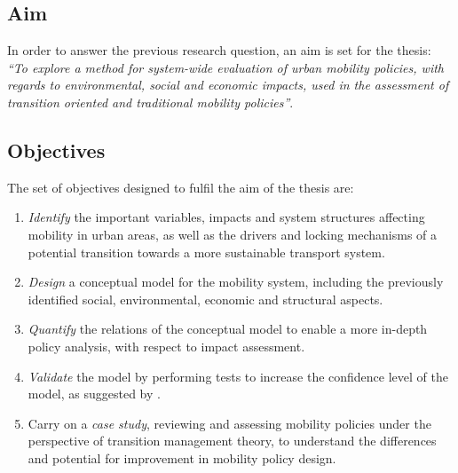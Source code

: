 \documentclass[a4paper,fontsize=10pt,bibliography=totoc]{scrartcl}
\begin{document}
\begin{multicols}{2}
\subsection*{Aim}
In order to answer the previous research question, an aim is set for the thesis: \textit{``To explore a method for system-wide evaluation of urban mobility policies, with regards to environmental, social and economic impacts, used in the assessment of transition oriented and traditional mobility policies''}.

\subsection*{Objectives}
The set of objectives designed to fulfil the aim of the thesis are:
\begin{enumerate}[label=(\alph*)]
	\item \textit{Identify} the important variables, impacts and system structures affecting mobility in urban areas, as well as the drivers and locking mechanisms of a potential transition towards a more sustainable transport system.
	\item \textit{Design} a conceptual model for the mobility system, including the previously identified social, environmental, economic and structural aspects.
	\item \textit{Quantify} the relations of the conceptual model to enable a more in-depth policy analysis, with respect to impact assessment.
	\item \textit{Validate} the model by performing tests to increase the confidence level of the model, as suggested by \textcite{forrester1978_TestsBuildingConfidence,qudrat-ullah2010_Howdostructural}.
	\item Carry on a \textit{case study}, reviewing and assessing mobility policies under the perspective of transition management theory, to understand the differences and potential for improvement in mobility policy design.
\end{enumerate}


\end{multicols}
\end{document}
